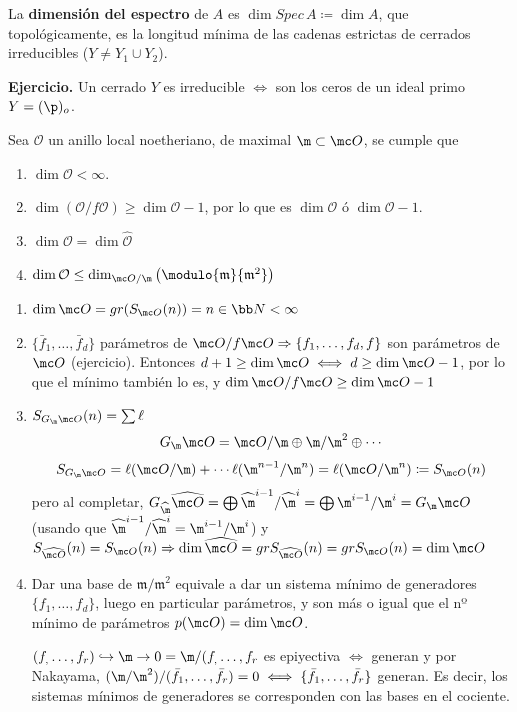 \begin{defi}
    La \textbf{dimensi\'on del espectro} de $A$ es $\dim Spec\, A \coloneqq \dim A$, que topol\'ogicamente, es la longitud m\'inima de las cadenas estrictas de cerrados irreducibles ($Y \neq Y_1 \cup Y_2$).
    
    \noindent \textbf{Ejercicio.} Un cerrado $Y$ es irreducible $\iff$ son los ceros de un ideal primo $Y = (\p)_o$.
\end{defi}
\begin{cor}
    Sea $\mathcal{O}$ un anillo local noetheriano, de maximal $\m \subset \mc O$, se cumple que
    \begin{enumerate}
        \item $\dim \mathcal{O} < \infty$.
        \item $\dim (\mathcal{O}/f\mathcal{O}) \ge \dim \mathcal{O} - 1$, por lo que es $\dim \mathcal{O}$ \'o $\dim \mathcal{O} - 1$.
        \item $\dim \mathcal{O} = \dim \hat{\mathcal{O}}$
        \item $\dim \mathcal{O} \le \dim_{\mc O/ \m } \left(\modulo{\mathfrak{m}}{\mathfrak{m}^2}\right)$
    \end{enumerate}
\end{cor}
\begin{dem}
    \begin{enumerate}
        \item $\dim \mc O = gr(S_{\mc O}(n)) = n \in \bb N < \infty$ 
        \item $\{\bar f_1, \ldots, \bar f_d\}$ par\'ametros de $\mc O /  f\mc O \Rightarrow \{f_1, \ldots, f_d,f\}$ son par\'ametros de $\mc O$ (ejercicio). Entonces $d+1  \ge \dim \mc O \iff d \geq \dim \mc O-1$, por lo que el m\'inimo tambi\'en lo es, y $\dim \mc O / f\mc O \ge \dim \mc O -1$ 
        \item $S_{G_\m \mc O} (n) =\sum \ell $ 
        $$G_{\m} \mc O = \mc O / \m \oplus \m / \m^2 \oplus \cdots $$
        $$S_{G_{\m}\mc O} = \ell(\mc O / \m) + \cdots \ell(\m^{n-1} / \m^n) = \ell(\mc O / \m^n) \coloneq S_{\mc O}(n)$$
        pero al completar, $G_{\widehat{\m}} \widehat{\mc O} = \bigoplus  \widehat{\m}^{i-1}/  \widehat{\m}^{i}=  \bigoplus \m^{i-1}/ \m^{i} = G_{\m } \mc O$ (usando que $ \widehat{\m}^{i-1}/  \widehat{\m}^{i}=  \m^{i-1}/ \m^{i}$) y $S_{\widehat{\mc O}}(n) = S_{\mc O}(n) \Rightarrow \dim \widehat{\mc O} = gr S_{\widehat{\mc O}}(n) = gr S_{\mc O}(n) = \dim \mc O$
        \item Dar una base de $\mathfrak{m}/\mathfrak{m}^2 $ equivale a dar un sistema m\'inimo de generadores $\{f_1, \ldots, f_d\}$, luego en particular par\'ametros, y son m\'as o igual que el nº mínimo de parámetros $p(\mc O) = \dim \mc O$. 

        $(f_, \ldots, f_r) \hookrightarrow \m \to 0 = \m /(f_, \ldots, f_r$ es epiyectiva $\iff$ generan y por Nakayama, $(\m/\m^2)/(\bar f_1, \ldots, \bar f_r) = 0 \iff \{\bar f_1, \ldots, \bar f_r\}$ generan. Es decir, los sistemas m\'inimos de generadores se corresponden con las bases en el cociente. 
    \end{enumerate}
\end{dem}
